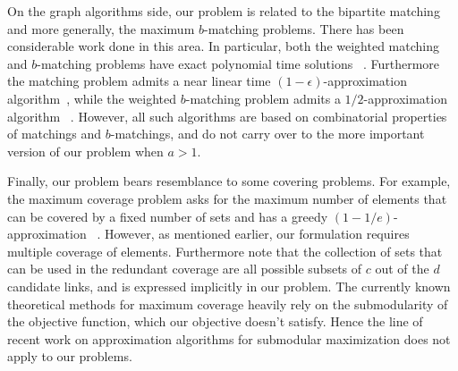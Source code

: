 On the graph algorithms side, our problem is related to the bipartite matching and more generally, the maximum $b$-matching problems. There has been considerable work done in this area.
In particular, both the weighted matching and $b$-matching problems have exact polynomial time solutions ~\cite{Gabow1983}. Furthermore the matching problem admits a near linear time $(1-\epsilon)$-approximation algorithm~\cite{duan2010approximating}, while the weighted $b$-matching problem admits a $1/2$-approximation algorithm ~\cite{koufogiannakis2009distributed}. However, all such algorithms are based on combinatorial properties of matchings and $b$-matchings, and do not carry over to the more important version of our problem when $a > 1$.

Finally, our problem bears resemblance to some covering problems. For example, the maximum coverage problem asks for the maximum number of elements that can be covered by a fixed number of sets and has a greedy $(1-1/e)$-approximation ~\cite{nemhauser1978analysis}. However, as mentioned earlier, our formulation requires multiple coverage of elements. Furthermore note that the collection of sets that can be used in the redundant coverage are all possible subsets of $c$ out of the $d$ candidate links, and is expressed implicitly in our problem.  The currently known theoretical methods for maximum coverage heavily rely on the submodularity of the objective function, which our objective doesn't satisfy. Hence the line of recent work on approximation algorithms for submodular maximization does not apply to our problems. 